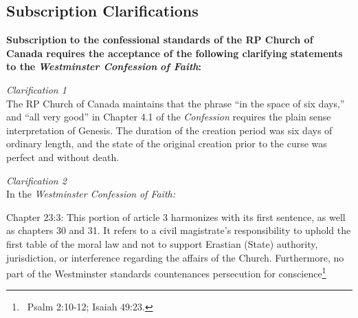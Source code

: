 \subsection[Subscription Clarifications]{\textbf{Subscription}\textbf{ Clarifications}} 

\textbf{Subscription}\textbf{ to the confessional standards of the RP Church of Canada requires the acceptance of the following clarifying}\textbf{ statements to the }\textbf{\textit{Westminster Confession}}\textbf{\textit{ of Faith}}\textbf{:}

\textit{Clarification 1}\\The RP Church of Canada maintains that the phrase ``in the space of six days,'' and ``all very good'' in Chapter 4.1 of the \textit{Confession}\textit{ }requires the plain sense interpretation of Genesis. The duration of the creation period was six days of ordinary length, and the state of the original creation prior to the curse was perfect and without death.\textsuperscript{ \footnotemark{}}

\textit{Clarification 2}\\In the \textit{Westminster Confession}\textit{ of Faith:}

\par Chapter 23:3: This portion of article 3 harmonizes with its first sentence, as well as chapters 30 and 31. It refers to a civil magistrate's responsibility to uphold the first table of the moral law and not to support Erastian (State) authority, jurisdiction, or interference regarding the affairs of the Church. Furthermore, no part of the Westminster standards countenances persecution for conscience\footnote{\ Psalm 2:10-12; Isaiah 49:23.}

